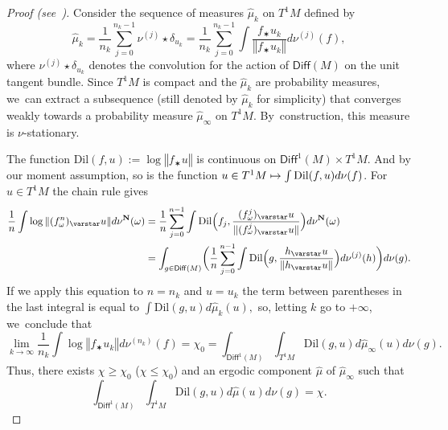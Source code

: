 \documentclass[JEP,XML,SOM,Unicode,published]{cedram}
\newcommand\mto{\mathchoice{\longmapsto}{\mapsto}{\mapsto}{\mapsto}}
\newcommand{\norm}[1]{{\left\Vert#1\right\Vert}}
\newcommand{\anorm}[1]{{\Vert#1\Vert}}
\newcommand{\lrpar}[1]{\left(#1\right)}
\newcommand{\Blrpar}[1]{\Bigl(#1\Bigr)}
\newcommand{\bblrpar}[1]{\biggl(#1\biggr)}
\def\N{\mathbf{N}}
\newcommand{\dil}{{\mathrm{Dil}}}
\newcommand\Diff{{\mathsf{Diff}}}
\theoremstyle{plain}
\theoremstyle{definition}
\begin{document}
\begin{proof}[Proof (see~\cite{chung, hurtado:burnside})]
Consider the
sequence of measures $\hat\mu_k$ on $T^1M$ defined by
\begin{equation*}
\hat\mu_k=\frac{1}{n_k} \sum_{j=0}^{n_k-1} \nu^{(j)}\star \delta_{u_k} =\frac{1}{n_k} \sum_{j=0}^{n_k-1}\int \frac{f_\varstar u_k}{\norm{f_\varstar u_k}} d\nu^{(j)}(f),
\end{equation*}
where $\nu^{(j)}\star \delta_{u_k}$ denotes the convolution for the action of $\Diff(M)$ on the unit tangent bundle. Since $T^1M$ is compact and the
$\hat\mu_k$ are probability measures, we~can extract a subsequence (still denoted by $\hat\mu_k$ for simplicity) that converges weakly towards a
probability measure $\hat\mu_\infty$ on $T^1M$. By~construction, this measure is $\nu$-stationary.

The function $\dil(f, u):=\log\norm{f_\varstar u}$ is continuous on
$\Diff^1(M)\times T^1M$. And by our moment assumption, so is the function
$u\in T^1M \mto \int \dil(f, u) d\nu(f)$.
For $ u\in T^1M$ the chain rule gives
\begin{align*}\notag
\frac{1}{n} \int \log\norm{(f^n_\omega)_\varstar u} d\nu^{\N}(\omega) & = \frac{1}{n} \sum_{j=0}^{n-1} \int \dil\Blrpar{f_j, \frac{(f^j_\omega)_\varstar u}{\anorm{(f^j_\omega)_\varstar u}}} d\nu^{\N}(\omega) \\
& = \int_{g\in \Diff(M)} \bblrpar{\frac{1}{n} \sum_{j=0}^{n-1} \int \dil\Blrpar{g, \frac{h_\varstar u}{\norm{h_\varstar u}}} d\nu^{(j)}(h) } d\nu(g).
\end{align*}
If we apply this equation to $n=n_k$ and $u=u_k$ the term between parentheses in
the last integral is equal to
$
\int \dil\lrpar{g,u} d\hat\mu_k(u),
$
so, letting $k$ go to $+\infty$, we~conclude that
\begin{equation*}
\lim_{k\to\infty} \frac{1}{n_k} \int \log \norm{f_\varstar u_k} d\nu^{(n_k)}(f) = \chi_0=
\int_{\Diff^1(M)}\int_{T^1M} \dil(g,u) d\hat\mu_\infty(u) d\nu(g).
\end{equation*}
Thus, there exists $\chi\geq \chi_0$ (\resp $\chi\leq \chi_0$) and
an ergodic component $\hat\mu$ of $\hat\mu_\infty$
such that
\begin{equation*}
\int_{\Diff^1(M)}\int_{T^1M} \dil(g,u) d\hat\mu (u) d\nu(g) = \chi.
\end{equation*}


\end{proof}
\end{document}
